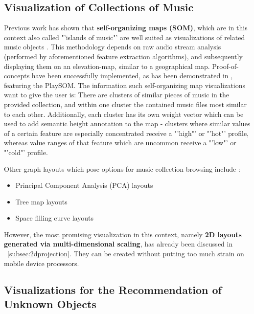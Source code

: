 \subsection{Visualization of Collections of Music}

Previous work has shown that \textbf{self-organizing maps (SOM)}, which are in this context also called "'islands of music"' are well suited as visualizations of related music objects \cite{Cooper:2006:VAM}. This methodology depends on raw audio stream analysis (performed by aforementioned feature extraction algorithms), and subsequently displaying them on an elevation-map, similar to a geographical map. Proof-of-concepts have been successfully implemented, as has been demonstrated in \cite{NeuDitRau_05ismir}, featuring the PlaySOM. The information such self-organizing map visualizations want to give the user is: There are clusters of similar pieces of music in the provided collection, and within one cluster the contained music files most similar to each other. Additionally, each cluster has its own weight vector which can be used to add semantic height annotation to the map - clusters where similar values of a certain feature are especially concentrated receive a "'high"' or "'hot"' profile, whereas value ranges of that feature which are uncommon receive a "'low"' or "'cold"' profile.

Other graph layouts which pose options for music collection browsing include \cite{Muelder:2010fk}:

\begin{itemize}
	\item Principal Component Analysis (PCA) layouts 
	\item Tree map layouts 
	\item Space filling curve layouts
\end{itemize}

However, the most promising visualization in this context, namely \textbf{2D layouts generated via multi-dimensional scaling}, has already been discussed in ~\ref{subsec:2dprojection}. They can be created without putting too much strain on mobile device processors.

\subsection{Visualizations for the Recommendation of Unknown Objects}

